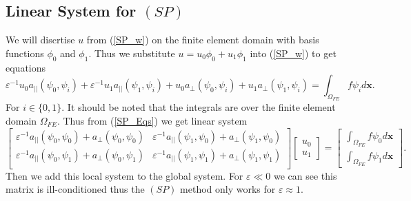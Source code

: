 \documentclass[12pt]{ociamthesis}
\begin{document}
\subsection{Linear System for $(SP)$}
We will discrtise $u$ from (\ref{SP_w}) on the finite element domain with basis functions $\phi_0$ and $\phi_1$. Thus we substitute $u=u_0\phi_0 + u_1 \phi_1$ into (\ref{SP_w}) to get equations 
\begin{equation} \label{SP_Eqs}
\varepsilon^{-1}u_0a_{||}(\psi_0, \psi_i) +
\varepsilon^{-1}u_1a_{||}(\psi_1, \psi_i) +
u_0a_{\perp}(\psi_0, \psi_i) +
u_1a_{\perp}(\psi_1, \psi_i) =
\int_{\Omega_{FE}} f \psi_i d\mathbf{x}.
\end{equation}
For $i \in \{0,1\}$. It should be noted that the integrals are over the finite element domain $\Omega_{FE}$. Thus from (\ref{SP_Eqs}) we get linear system
\begin{equation} 
\left[
\begin{matrix}
\varepsilon^{-1}a_{||}(\psi_0, \psi_0) + a_{\perp}(\psi_0,\psi_0) &
\varepsilon^{-1}a_{||}(\psi_1, \psi_0) + a_{\perp}(\psi_1,\psi_0)\\
\varepsilon^{-1}a_{||}(\psi_0, \psi_1) + a_{\perp}(\psi_0,\psi_1) &
\varepsilon^{-1}a_{||}(\psi_1, \psi_1) + a_{\perp}(\psi_1,\psi_1)\\
\end{matrix}
\right] 
\left [
\begin{matrix}
u_0 \\
u_1
\end{matrix}
\right ] =
\left[
\begin{matrix}
\int_{\Omega_{FE}} f \psi_0 d\mathbf{x} \\
\int_{\Omega_{FE}} f \psi_1 d\mathbf{x}
\end{matrix}
\right].
\end{equation}
Then we add this local system to the global system. For $\varepsilon \ll 0$ we can see this matrix is ill-conditioned thus the $(SP)$ method only works for $\varepsilon \approx 1$.
\end{document}

